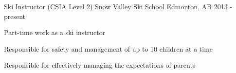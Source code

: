 \begin{cventries}
  \cventry
    {Ski Instructor (CSIA Level 2)} %
    {Snow Valley Ski School} %
    {Edmonton, AB} %
    {2013 - present} %
    {
      \begin{cvitems} %
      \item {Part-time work as a ski instructor}
      \item {Responsible for safety and management of up to 10 children at a time}
      \item {Responsible for effectively managing the expectations of parents}
      \end{cvitems}
    }
\end{cventries}
